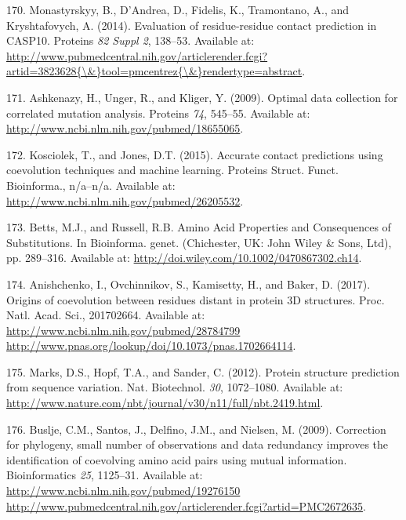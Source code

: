 \documentclass[11pt,a4paper,twoside]{book}
\theoremstyle{definition}
\theoremstyle{definition}
\theoremstyle{remark}
\begin{document}
\hypertarget{ref-Monastyrskyy2014a}{}
170. Monastyrskyy, B., D'Andrea, D., Fidelis, K., Tramontano, A., and
Kryshtafovych, A. (2014). Evaluation of residue-residue contact
prediction in CASP10. Proteins \emph{82 Suppl 2}, 138--53. Available at:
\href{http://www.pubmedcentral.nih.gov/articlerender.fcgi?artid=3823628\%7B/\&\%7Dtool=pmcentrez\%7B/\&\%7Drendertype=abstract}{http://www.pubmedcentral.nih.gov/articlerender.fcgi?artid=3823628\{\textbackslash{}\&\}tool=pmcentrez\{\textbackslash{}\&\}rendertype=abstract}.

\hypertarget{ref-Ashkenazy2009}{}
171. Ashkenazy, H., Unger, R., and Kliger, Y. (2009). Optimal data
collection for correlated mutation analysis. Proteins \emph{74},
545--55. Available at:
\url{http://www.ncbi.nlm.nih.gov/pubmed/18655065}.

\hypertarget{ref-Kosciolek2015a}{}
172. Kosciolek, T., and Jones, D.T. (2015). Accurate contact predictions
using coevolution techniques and machine learning. Proteins Struct.
Funct. Bioinforma., n/a--n/a. Available at:
\url{http://www.ncbi.nlm.nih.gov/pubmed/26205532}.

\hypertarget{ref-Bettsa}{}
173. Betts, M.J., and Russell, R.B. Amino Acid Properties and
Consequences of Substitutions. In Bioinforma. genet. (Chichester, UK:
John Wiley \& Sons, Ltd), pp. 289--316. Available at:
\url{http://doi.wiley.com/10.1002/0470867302.ch14}.

\hypertarget{ref-Anishchenko2017}{}
174. Anishchenko, I., Ovchinnikov, S., Kamisetty, H., and Baker, D.
(2017). Origins of coevolution between residues distant in protein 3D
structures. Proc. Natl. Acad. Sci., 201702664. Available at:
\href{http://www.ncbi.nlm.nih.gov/pubmed/28784799\%20http://www.pnas.org/lookup/doi/10.1073/pnas.1702664114}{http://www.ncbi.nlm.nih.gov/pubmed/28784799 http://www.pnas.org/lookup/doi/10.1073/pnas.1702664114}.

\hypertarget{ref-Marks2012}{}
175. Marks, D.S., Hopf, T.A., and Sander, C. (2012). Protein structure
prediction from sequence variation. Nat. Biotechnol. \emph{30},
1072--1080. Available at:
\url{http://www.nature.com/nbt/journal/v30/n11/full/nbt.2419.html}.

\hypertarget{ref-Buslje2009}{}
176. Buslje, C.M., Santos, J., Delfino, J.M., and Nielsen, M. (2009).
Correction for phylogeny, small number of observations and data
redundancy improves the identification of coevolving amino acid pairs
using mutual information. Bioinformatics \emph{25}, 1125--31. Available
at:
\href{http://www.ncbi.nlm.nih.gov/pubmed/19276150\%20http://www.pubmedcentral.nih.gov/articlerender.fcgi?artid=PMC2672635}{http://www.ncbi.nlm.nih.gov/pubmed/19276150 http://www.pubmedcentral.nih.gov/articlerender.fcgi?artid=PMC2672635}.
\end{document}
